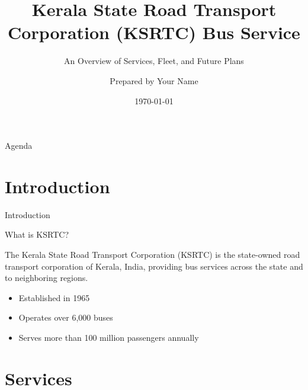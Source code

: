 \documentclass[aspectratio=169,11pt]{beamer}
\title{Kerala State Road Transport Corporation (KSRTC) Bus Service}
\subtitle{An Overview of Services, Fleet, and Future Plans}
\author{Prepared by Your Name}
\date{\today}
\begin{document}

\begin{frame}

  \titlepage

\end{frame}




\begin{frame}{Agenda}

  \tableofcontents

\end{frame}




\section{Introduction}

\begin{frame}{Introduction}

  \begin{block}{What is KSRTC?}

    The Kerala State Road Transport Corporation (KSRTC) is the state-owned road transport corporation of Kerala, India, providing bus services across the state and to neighboring regions.

  \end{block}

  \begin{itemize}

    \item Established in 1965

    \item Operates over 6,000 buses

    \item Serves more than 100 million passengers annually

  \end{itemize}

\end{frame}




\section{Services}
\end{document}
